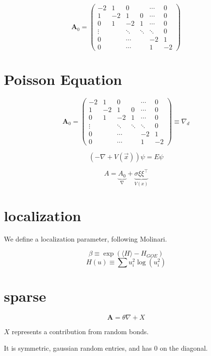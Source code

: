 \documentclass{article}
\begin{document}
\begin{equation}
	\boldsymbol{A}_0 = 
\begin{pmatrix}
	-2 & 1 & 0 & &\cdots & 0 \\
	1 & -2 & 1 & 0 & \cdots & 0 \\
	0 & 1 & -2 & 1 & \cdots & 0  \\
	\vdots & &\ddots& \ddots  & \ddots & 0\\
	0& & \cdots && -2 & 1\\
	0 & & \cdots & &1& -2
\end{pmatrix}
\end{equation}


\section{Poisson Equation}

\begin{equation}
	\boldsymbol{A}_0 = 
\begin{pmatrix}
	-2 & 1 & 0 & &\cdots & 0 \\
	1 & -2 & 1 & 0 & \cdots & 0 \\
	0 & 1 & -2 & 1 & \cdots & 0  \\
	\vdots & &\ddots& \ddots  & \ddots & 0\\
	0& & \cdots && -2 & 1\\
	0 & & \cdots & &1& -2
\end{pmatrix} \equiv \nabla_d
\end{equation}


\begin{equation}
	\left( -\nabla + V(\vec{x})\right) \psi = E\psi
\end{equation}

\begin{equation}
	A = \underbrace{A_0}_{\nabla} + \underbrace{\sigma\xi \xi^\intercal}_{V(x)}
\end{equation}

\section{localization}%
\label{sec:localization}

We define a localization parameter, following Molinari.

\begin{equation}
	\beta \equiv \exp{\left( \langle H \rangle - H_{GOE} \right)}
\end{equation}
\begin{equation}
	H \left( u \right)\equiv \sum u_i ^2 \log{\left( u_i^2 \right)}
\end{equation}

\section{sparse}%
\label{sec:sparse}

\begin{equation}
	\boldsymbol{A} = \theta \nabla + X
\end{equation}

$X$ represents a contribution from random bonds. 

It is symmetric, gaussian random entries, and has 0 on the diagonal.
\end{document}
